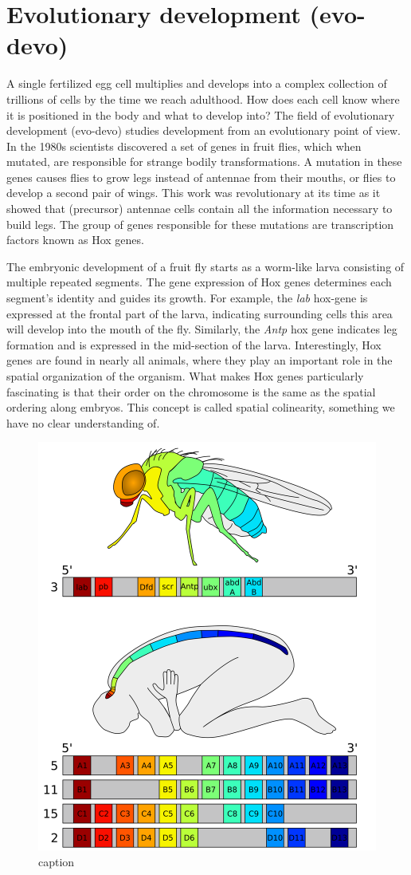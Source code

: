 \section{Evolutionary development (evo-devo)}

A single fertilized egg cell multiplies and develops into a complex collection of trillions of cells by the time we reach adulthood. How does each cell know where it is positioned in the body and what to develop into? The field of evolutionary development (evo-devo) studies development from an evolutionary point of view. In the 1980s scientists discovered a set of genes in fruit flies, which when mutated, are responsible for strange bodily transformations. A mutation in these genes causes flies to grow legs instead of antennae from their mouths\cite{Schneuwly1987}, or flies to develop a second pair of wings\cite{Weatherbee1998}. This work was revolutionary at its time as it showed that (precursor) antennae cells contain all the information necessary to build legs. The group of genes responsible for these mutations are transcription factors  known as Hox genes.

The embryonic development of a fruit fly starts as a worm-like larva consisting of multiple repeated segments. The gene expression of Hox genes determines each segment's identity and guides its growth. For example, the \textit{lab} hox-gene is expressed at the frontal part of the larva, indicating surrounding cells this area will develop into the mouth of the fly\cite{Hughes2002}. Similarly, the \textit{Antp} hox gene indicates leg formation and is expressed in the mid-section of the larva. Interestingly, Hox genes are found in nearly all animals, where they play an important role in the spatial organization of the organism. What makes Hox genes particularly fascinating is that their order on the chromosome is the same as the spatial ordering along embryos. This concept is called spatial colinearity, something we have no clear understanding of\cite{Gaunt2015}.

\begin{figure}[H]
    \includegraphics[width=0.5\linewidth]{ch.introduction/imgs/hox.png}
    \caption{caption}
    \label{fig:hox}
\end{figure}

